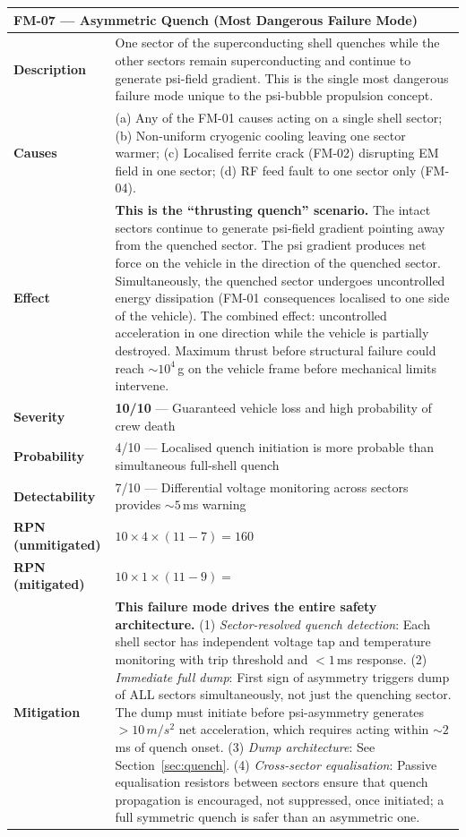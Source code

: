 \documentclass[11pt,a4paper]{article}
\newcommand{\Scrit}[1]{\cellcolor{risk-critical!40}\textbf{#1}}
\newcommand{\Smed}[1]{\cellcolor{risk-medium!40}{#1}}
\begin{document}
\begin{longtable}{p{0.25\tw}p{0.65\tw}}
\toprule
\multicolumn{2}{l}{\textbf{FM-07 --- Asymmetric Quench (Most Dangerous Failure Mode)}} \\
\midrule
\endhead
\textbf{Description} &
  One sector of the superconducting shell quenches while the other
  sectors remain superconducting and continue to generate psi-field
  gradient. This is the single most dangerous failure mode unique to
  the psi-bubble propulsion concept. \\[4pt]
\textbf{Causes} &
  (a) Any of the FM-01 causes acting on a single shell sector;
  (b) Non-uniform cryogenic cooling leaving one sector warmer;
  (c) Localised ferrite crack (FM-02) disrupting EM field in one sector;
  (d) RF feed fault to one sector only (FM-04). \\[4pt]
\textbf{Effect} &
  \textbf{This is the ``thrusting quench'' scenario.} The intact sectors
  continue to generate psi-field gradient pointing away from the
  quenched sector. The psi gradient produces net force on the vehicle
  in the direction of the quenched sector. Simultaneously, the quenched
  sector undergoes uncontrolled energy dissipation (FM-01 consequences
  localised to one side of the vehicle). The combined effect: uncontrolled
  acceleration in one direction while the vehicle is partially destroyed.
  Maximum thrust before structural failure could reach $\sim 10^4$\,g
  on the vehicle frame before mechanical limits intervene. \\[4pt]
\textbf{Severity} & \Scrit{10/10} --- Guaranteed vehicle loss and
  high probability of crew death \\[4pt]
\textbf{Probability} & 4/10 --- Localised quench initiation is more
  probable than simultaneous full-shell quench \\[4pt]
\textbf{Detectability} & 7/10 --- Differential voltage monitoring across
  sectors provides $\sim 5$\,ms warning \\[4pt]
\textbf{RPN (unmitigated)} & \Scrit{$10 \times 4 \times (11-7) = 160$} \\[4pt]
\textbf{RPN (mitigated)} & $10 \times 1 \times (11-9) = $ \Smed{20} \\[4pt]
\textbf{Mitigation} &
  \textbf{This failure mode drives the entire safety architecture.}
  (1) \textit{Sector-resolved quench detection}: Each shell sector has
  independent voltage tap and temperature monitoring with trip threshold
  and $<1$\,ms response. (2) \textit{Immediate full dump}: First sign
  of asymmetry triggers dump of ALL sectors simultaneously, not just the
  quenching sector. The dump must initiate before psi-asymmetry
  generates $> 10\,\si{m/s^2}$ net acceleration, which requires
  acting within $\sim 2$\,ms of quench onset. (3) \textit{Dump
  architecture}: See Section~\ref{sec:quench}. (4) \textit{Cross-sector
  equalisation}: Passive equalisation resistors between sectors ensure
  that quench propagation is encouraged, not suppressed, once initiated;
  a full symmetric quench is safer than an asymmetric one. \\
\bottomrule
\end{longtable}
\end{document}
